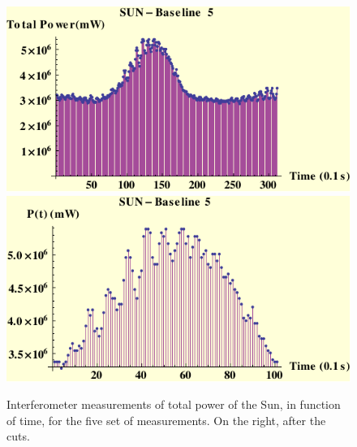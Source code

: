 \begin{figure}[htb]
\begin{center}
 \includegraphics[scale=0.7]{plots/sun5pow.pdf}
 \includegraphics[scale=0.7]{plots/sun5powc.pdf}
\caption{Interferometer measurements of total power of the Sun, in function of time, for the five set of measurements. On the right, after the  cuts.}
\label{voltpow2}
\end{center}
\end{figure}

